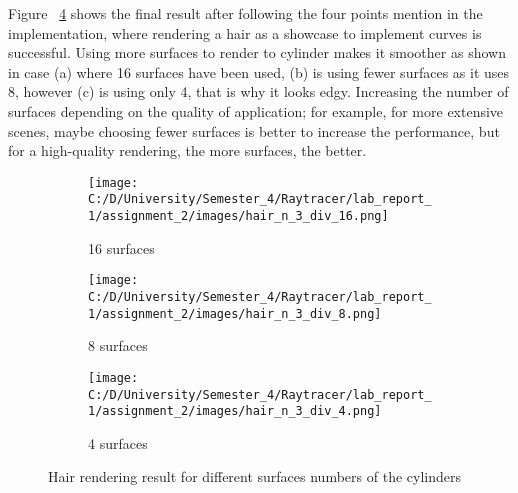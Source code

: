 \documentclass{article}
\begin{document}
	Figure ~\ref{fig:10} shows the final result after following the four points mention in the implementation, where rendering a hair as a showcase to implement curves is successful. Using more surfaces to render to cylinder makes it smoother as shown in case (a) where 16 surfaces have been used, (b) is using fewer surfaces as it uses 8, however (c) is using only 4, that is why it looks edgy. Increasing the number of surfaces depending on the quality of application; for example, for more extensive scenes, maybe choosing fewer surfaces is better to increase the performance, but for a high-quality rendering, the more surfaces, the better.
	\begin{figure}[H]
		\begin{center}
			\begin{subfigure}{.3\textwidth}
				\centering
				\texttt{[image: C:/D/University/Semester\_4/Raytracer/lab\_report\_1/assignment\_2/images/hair\_n\_3\_div\_16.png]}  
				\caption{16 surfaces}
				\label{fig:sub-first}
			\end{subfigure}
			\begin{subfigure}{.3\textwidth}
				\centering
				\texttt{[image: C:/D/University/Semester\_4/Raytracer/lab\_report\_1/assignment\_2/images/hair\_n\_3\_div\_8.png]}  
				\caption{8 surfaces}
				\label{fig:sub-second}
			\end{subfigure}
			\begin{subfigure}{.3\textwidth}
				\centering
				\texttt{[image: C:/D/University/Semester\_4/Raytracer/lab\_report\_1/assignment\_2/images/hair\_n\_3\_div\_4.png]}  
				\caption{4 surfaces}
				\label{fig:sub-third}
			\end{subfigure}
			\caption{Hair rendering result for different surfaces numbers of the cylinders}
			\label{fig:10}
		\end{center}
	\end{figure}
	
\end{document}
